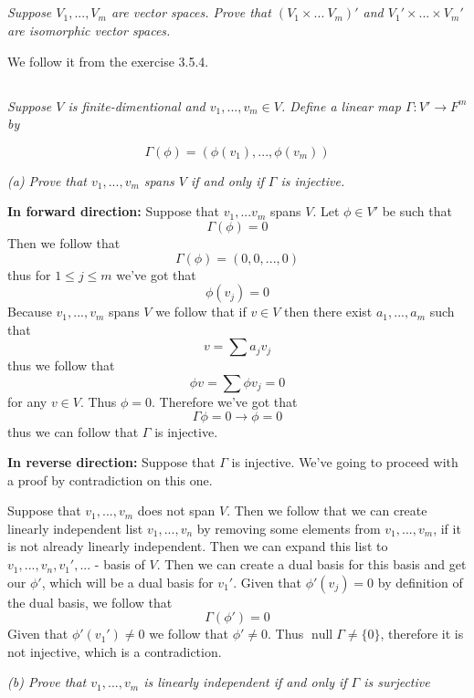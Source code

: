 \documentclass[11pt,oneside,titlepage]{book}
\DeclareMathOperator \ns {null}
\begin{document}
\subsection{}


\textit{Suppose $V_1, ..., V_m$ are vector spaces. Prove that $(V_1 \times  ... \ V_m)'$
  and $V_1' \times ... \times V_m'$ are isomorphic vector spaces.}

We follow it from the exercise 3.5.4.

\subsection{}

\textit{Suppose $V$ is finite-dimentional and $v_1, ..., v_m \in V$. Define a linear
  map $\Gamma: V' \to F^m$ by}

$$\Gamma(\phi) = (\phi(v_1), ..., \phi (v_m))$$

\textit{(a) Prove that $v_1, ..., v_m$ spans $V$ if and only if $\Gamma$ is injective.}

\textbf{In forward direction: }
Suppose that $v_1, ... v_m$ spans $V$. Let $\phi \in V'$ be such that
$$\Gamma(\phi) = 0$$
Then we follow that
$$\Gamma(\phi) = (0, 0, ..., 0)$$
thus for $1 \leq j \leq m$ we've got that
$$\phi(v_j) = 0$$
Because $v_1, ..., v_m$ spans $V$ we follow that if $v \in V$ then there exist
$a_1, ..., a_m$ such that
$$v = \sum{a_j v_j}$$
thus we follow that
$$\phi v = \sum {\phi v_j} = 0$$
for any $v \in V$. Thus $\phi = 0$. Therefore we've got that
$$\Gamma \phi = 0 \to \phi = 0$$
thus we can follow that $\Gamma$ is injective.

\textbf{In reverse direction: }
Suppose that $\Gamma$ is injective. We've going to proceed with a proof by contradiction on
this one.

Suppose that $v_1, ..., v_m$ does not span $V$. Then we follow that we can create 
linearly independent list  $v_1, ..., v_n$ by removing some elements from $v_1, ..., v_m$, if
it is not already linearly independent. Then we can expand this list to
$v_1, ..., v_n, v_1', ...$ - basis of $V$. Then we can create a dual basis for this basis
and get our $\phi'$, which will be a dual basis for $v_1'$. Given that $\phi'(v_j) = 0$
by definition of the dual basis, we follow that
$$\Gamma(\phi') = 0$$
Given that $\phi'(v_1') \neq 0$ we follow that $\phi' \neq 0$. Thus
$\ns \Gamma \neq \{0\}$, therefore it is not injective, which is a contradiction.

\textit{(b) Prove that $v_1, ..., v_m$ is linearly independent if and only if $\Gamma$
  is surjective }
\end{document}
